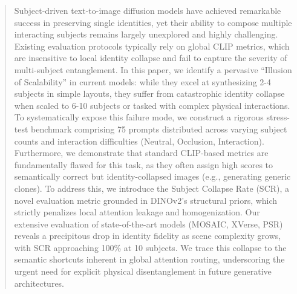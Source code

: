 \begin{abstract}
Subject-driven text-to-image diffusion models have achieved remarkable success in preserving single identities, yet their ability to compose multiple interacting subjects remains largely unexplored and highly challenging. Existing evaluation protocols typically rely on global CLIP metrics, which are insensitive to local identity collapse and fail to capture the severity of multi-subject entanglement. In this paper, we identify a pervasive ``Illusion of Scalability'' in current models: while they excel at synthesizing 2-4 subjects in simple layouts, they suffer from catastrophic identity collapse when scaled to 6-10 subjects or tasked with complex physical interactions. To systematically expose this failure mode, we construct a rigorous stress-test benchmark comprising 75 prompts distributed across varying subject counts and interaction difficulties (Neutral, Occlusion, Interaction). Furthermore, we demonstrate that standard CLIP-based metrics are fundamentally flawed for this task, as they often assign high scores to semantically correct but identity-collapsed images (e.g., generating generic clones). To address this, we introduce the Subject Collapse Rate (SCR), a novel evaluation metric grounded in DINOv2's structural priors, which strictly penalizes local attention leakage and homogenization. Our extensive evaluation of state-of-the-art models (MOSAIC, XVerse, PSR) reveals a precipitous drop in identity fidelity as scene complexity grows, with SCR approaching 100\% at 10 subjects. We trace this collapse to the semantic shortcuts inherent in global attention routing, underscoring the urgent need for explicit physical disentanglement in future generative architectures.
\end{abstract}
